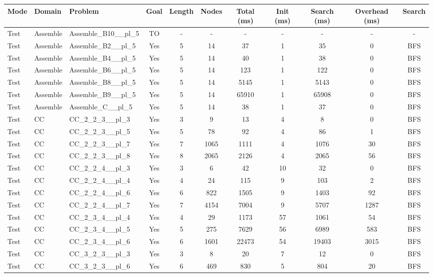 \documentclass{article}
\begin{document}
\begin{tabular}{lllcccccccc}
\toprule
Mode & Domain & Problem & Goal & Length & Nodes & Total (ms) & Init (ms) & Search (ms) & Overhead (ms) & Search \\
\midrule
Test & Assemble & Assemble\_B10\_\_pl\_5 & TO & - & - & - & - & - & - & - \\
Test & Assemble & Assemble\_B2\_\_pl\_5 & Yes & 5 & 14 & 37 & 1 & 35 & 0 & BFS \\
Test & Assemble & Assemble\_B4\_\_pl\_5 & Yes & 5 & 14 & 40 & 1 & 38 & 0 & BFS \\
Test & Assemble & Assemble\_B6\_\_pl\_5 & Yes & 5 & 14 & 123 & 1 & 122 & 0 & BFS \\
Test & Assemble & Assemble\_B8\_\_pl\_5 & Yes & 5 & 14 & 5145 & 1 & 5143 & 0 & BFS \\
Test & Assemble & Assemble\_B9\_\_pl\_5 & Yes & 5 & 14 & 65910 & 1 & 65908 & 0 & BFS \\
Test & Assemble & Assemble\_C\_\_pl\_5 & Yes & 5 & 14 & 38 & 1 & 37 & 0 & BFS \\
Test & CC & CC\_2\_2\_3\_\_pl\_3 & Yes & 3 & 9 & 13 & 4 & 8 & 0 & BFS \\
Test & CC & CC\_2\_2\_3\_\_pl\_5 & Yes & 5 & 78 & 92 & 4 & 86 & 1 & BFS \\
Test & CC & CC\_2\_2\_3\_\_pl\_7 & Yes & 7 & 1065 & 1111 & 4 & 1076 & 30 & BFS \\
Test & CC & CC\_2\_2\_3\_\_pl\_8 & Yes & 8 & 2065 & 2126 & 4 & 2065 & 56 & BFS \\
Test & CC & CC\_2\_2\_4\_\_pl\_3 & Yes & 3 & 6 & 42 & 10 & 32 & 0 & BFS \\
Test & CC & CC\_2\_2\_4\_\_pl\_4 & Yes & 4 & 24 & 115 & 9 & 103 & 2 & BFS \\
Test & CC & CC\_2\_2\_4\_\_pl\_6 & Yes & 6 & 822 & 1505 & 9 & 1403 & 92 & BFS \\
Test & CC & CC\_2\_2\_4\_\_pl\_7 & Yes & 7 & 4154 & 7004 & 9 & 5707 & 1287 & BFS \\
Test & CC & CC\_2\_3\_4\_\_pl\_4 & Yes & 4 & 29 & 1173 & 57 & 1061 & 54 & BFS \\
Test & CC & CC\_2\_3\_4\_\_pl\_5 & Yes & 5 & 275 & 7629 & 56 & 6989 & 583 & BFS \\
Test & CC & CC\_2\_3\_4\_\_pl\_6 & Yes & 6 & 1601 & 22473 & 54 & 19403 & 3015 & BFS \\
Test & CC & CC\_3\_2\_3\_\_pl\_3 & Yes & 3 & 8 & 20 & 7 & 12 & 0 & BFS \\
Test & CC & CC\_3\_2\_3\_\_pl\_6 & Yes & 6 & 469 & 830 & 5 & 804 & 20 & BFS \\

\end{tabular}
\end{document}

